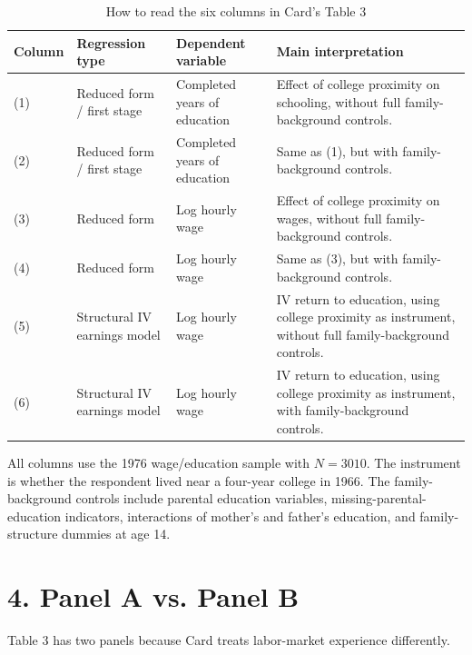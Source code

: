\documentclass[11pt,a4paper]{article}
\begin{document}
\begin{table}[h!]
\centering
\begin{threeparttable}
\caption{How to read the six columns in Card's Table 3}
\begin{tabular}{>{\raggedright\arraybackslash}p{1.5cm}
                >{\raggedright\arraybackslash}p{3.6cm}
                >{\raggedright\arraybackslash}p{3.5cm}
                >{\raggedright\arraybackslash}p{4.0cm}}
\toprule
Column & Regression type & Dependent variable & Main interpretation \\
\midrule
(1) & Reduced form / first stage & Completed years of education & Effect of college proximity on schooling, without full family-background controls. \\
(2) & Reduced form / first stage & Completed years of education & Same as (1), but with family-background controls. \\
(3) & Reduced form & Log hourly wage & Effect of college proximity on wages, without full family-background controls. \\
(4) & Reduced form & Log hourly wage & Same as (3), but with family-background controls. \\
(5) & Structural IV earnings model & Log hourly wage & IV return to education, using college proximity as instrument, without full family-background controls. \\
(6) & Structural IV earnings model & Log hourly wage & IV return to education, using college proximity as instrument, with family-background controls. \\
\bottomrule
\end{tabular}
\begin{tablenotes}
\small
\item All columns use the 1976 wage/education sample with \(N=3010\). The instrument is whether the respondent lived near a four-year college in 1966. The family-background controls include parental education variables, missing-parental-education indicators, interactions of mother's and father's education, and family-structure dummies at age 14.
\end{tablenotes}
\end{threeparttable}
\end{table}

\section*{4. Panel A vs. Panel B}

Table 3 has two panels because Card treats labor-market experience differently.
\end{document}
